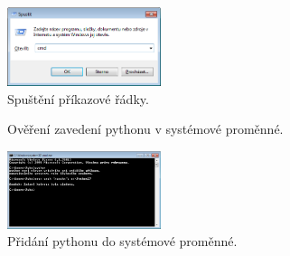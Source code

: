 \begin{figure}[htb]
	\centering
	\includegraphics[width=0.4\textwidth]{spustit_cmd.png}
	\caption{Spuštění příkazové řádky.}
	\label{fig:run_cmd}
\end{figure}

\begin{figure}[htb]
	\centering
	\hskip 0.2cm
	\caption{Ověření zavedení pythonu v systémové proměnné.}
	\label{fig:cmd_python_help}
\end{figure}

\begin{figure}[htb]
	\centering
	\includegraphics[width=0.4\textwidth]{cmd_python_added.png}
	\caption{Přidání pythonu do systémové proměnné.}
	\label{fig:cmd_python_added}
\end{figure}

